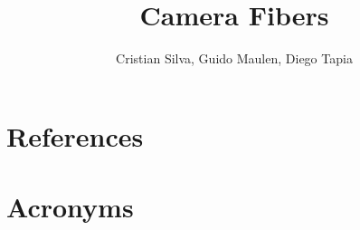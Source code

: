 \documentclass[PMO,authoryear,toc]{lsstdoc}
\title{Camera Fibers}
\author{%
Cristian Silva, Guido Maulen, Diego Tapia
}
\begin{document}
\maketitle




\appendix
\section{References} \label{sec:bib}
\renewcommand{\refname}{} %


\section{Acronyms} \label{sec:acronyms}

\end{document}
